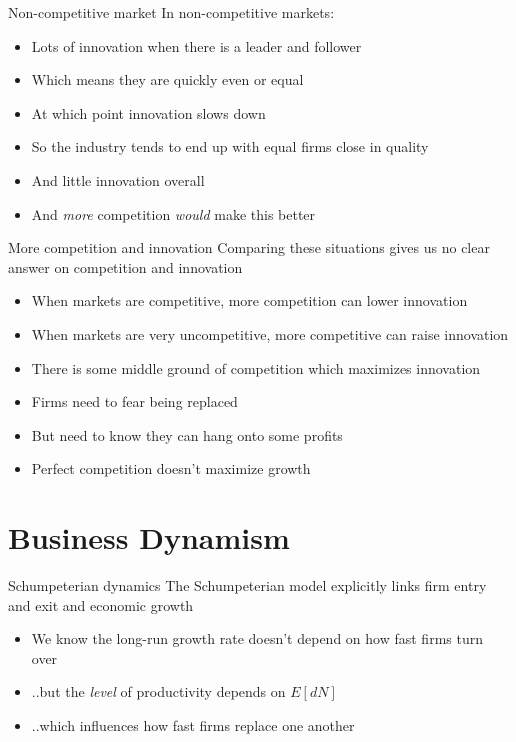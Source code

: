 \begin{frame}{Non-competitive market}
In non-competitive markets:
\begin{itemize}
	\item Lots of innovation when there is a leader and follower
	\item Which means they are quickly even or equal
	\item At which point innovation slows down
	\item So the industry tends to end up with equal firms close in quality
	\item And little innovation overall
	\item And \textit{more} competition \textit{would} make this better
\end{itemize}
\end{frame}

\begin{frame}{More competition and innovation}
Comparing these situations gives us no clear answer on competition and innovation
\begin{itemize}
	\item When markets are competitive, more competition can lower innovation
	\item When markets are very uncompetitive, more competitive can raise innovation
	\item There is some middle ground of competition which maximizes innovation
	\item Firms need to fear being replaced
	\item But need to know they can hang onto some profits
	\item Perfect competition doesn't maximize growth
\end{itemize}
\end{frame}

\section{Business Dynamism}

\begin{frame}{Schumpeterian dynamics}
The Schumpeterian model explicitly links firm entry and exit and economic growth
\begin{itemize}
	\item We know the long-run growth rate doesn't depend on how fast firms turn over
	\item ..but the \textit{level} of productivity depends on $E[dN]$
	\item ..which influences how fast firms replace one another
\end{itemize}
\end{frame}

